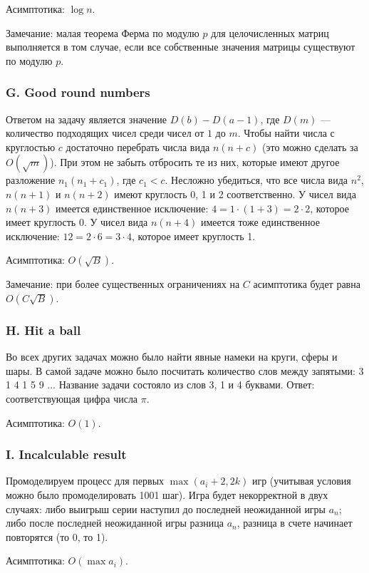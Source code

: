 Асимптотика: $\log {n}$.

Замечание: малая теорема Ферма по модулю $p$ для целочисленных матриц выполняется в том случае, если все собственные значения матрицы существуют по модулю $p$.

\subsubsection*{G. Good round numbers}


Ответом на задачу является значение $D(b) - D(a-1)$, где $D(m)$ --- количество подходящих чисел среди чисел от $1$ до $m$. Чтобы найти числа с круглостью $c$ достаточно перебрать числа вида $n(n+c)$ (это можно сделать за $O(\sqrt{m})$). При этом не забыть отбросить те из них, которые имеют другое разложение $n_1(n_1 + c_1)$, где $c_1 < c$.  Несложно убедиться, что все числа вида $n^2$, $n(n+1)$ и $n(n+2)$ имеют круглость 0, 1 и 2 соответственно. У чисел вида $n(n+3)$ имеется единственное исключение: $4 = 1 \cdot (1 + 3) = 2 \cdot 2$, которое имеет круглость 0. У чисел вида $n(n+4)$ имеется тоже единственное исключение: $12 = 2 \cdot 6 = 3 \cdot 4$, которое имеет круглость 1.

Асимптотика: $O(\sqrt {B})$.

Замечание: при более существенных ограничениях на $C$ асимптотика будет равна $O(C \sqrt {B})$.

\subsubsection*{H. Hit a ball}


Во всех других задачах можно было найти явные намеки на круги, сферы и шары. В самой задаче можно было посчитать количество слов между запятыми: 3 1 4 1 5 9 ... Название задачи состояло из слов 3, 1 и 4 буквами. Ответ: соответствующая цифра числа $\pi$.

Асимптотика: $O(1)$.

\subsubsection*{I. Incalculable result}


Промоделируем процесс для первых $\max (a_i + 2, 2 k)$ игр (учитывая условия можно было промоделировать 1001 шаг). Игра будет некорректной в двух случаях: либо выигрыш серии наступил до последней неожиданной игры $a_n$; либо после последней неожиданной игры разница $a_n$, разница в счете начинает повторятся (то 0, то 1).

Асимптотика: $O(\max{a_i})$.
